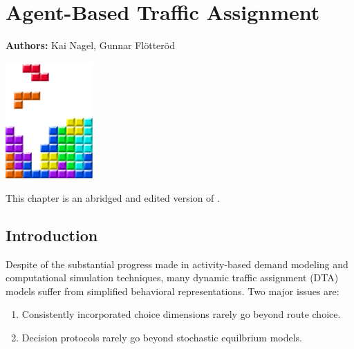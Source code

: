 \def\todoNextRevision#1{{\color{blue}[[``todo next revision'': #1]]}}

\chapter{Agent-Based Traffic Assignment }
\label{ch:abta}

\hfill \textbf{Authors:} Kai Nagel, Gunnar Flötteröd

\begin{center} \includegraphics[width=0.25\textwidth, angle=0]{figures/MATSimBook.png} \end{center}





This chapter is an abridged and edited version of \citet{NagelFloetteroed2009IatbrResourceInBook}.

\section{Introduction}


Despite of the substantial progress made in activity-based demand modeling and computational simulation techniques, many dynamic traffic assignment (DTA) models suffer from simplified behavioral representations. Two major issues are:
\begin{enumerate}
\item Consistently incorporated choice dimensions rarely go beyond route choice.
\item Decision protocols rarely go beyond stochastic equilbrium models.
\end{enumerate}


